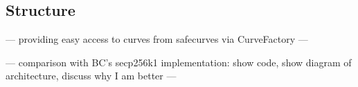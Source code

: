 \subsection{Structure}



--- providing easy access to curves from safecurves via CurveFactory ---

--- comparison with BC's secp256k1 implementation: show code, show diagram of architecture, discuss why I am better ---
